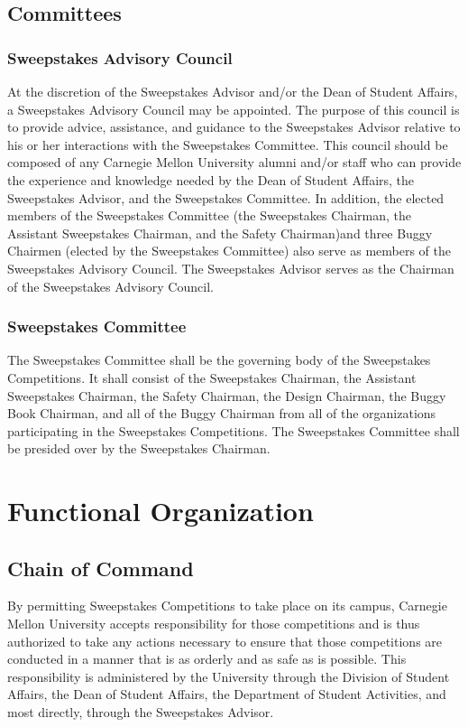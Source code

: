 \subsection{Committees}

\subsubsection{Sweepstakes Advisory Council}

	At the discretion of the Sweepstakes Advisor and/or the Dean of Student
	Affairs, a Sweepstakes Advisory Council may be appointed. The purpose of this
	council is to provide advice, assistance, and guidance to the Sweepstakes
	Advisor relative to his or her interactions with the Sweepstakes Committee.
	This council should be composed of any Carnegie Mellon University alumni and/or
	staff who can provide the experience and knowledge needed by the Dean of
	Student Affairs, the Sweepstakes Advisor, and the Sweepstakes Committee. In
	addition, the elected members of the Sweepstakes Committee (the Sweepstakes
	Chairman, the Assistant Sweepstakes Chairman, and the Safety Chairman)and three
	Buggy Chairmen (elected by the Sweepstakes Committee) also serve as members of
	the Sweepstakes Advisory Council. The Sweepstakes Advisor serves as the
	Chairman of the Sweepstakes Advisory Council.

\subsubsection{Sweepstakes Committee}

	The Sweepstakes Committee shall be the governing body of the Sweepstakes
	Competitions. It shall consist of the Sweepstakes Chairman, the Assistant
	Sweepstakes Chairman, the Safety Chairman, the Design Chairman, the Buggy Book
	Chairman, and all of the Buggy Chairman from all of the organizations
	participating in the Sweepstakes Competitions. The Sweepstakes Committee shall
	be presided over by the Sweepstakes Chairman.

\section{Functional Organization}

\subsection{Chain of Command}

	By permitting Sweepstakes Competitions to take place on its campus, Carnegie
	Mellon University accepts responsibility for those competitions and is thus
	authorized to take any actions necessary to ensure that those competitions are
	conducted in a manner that is as orderly and as safe as is possible. This
	responsibility is administered by the University through the Division of
	Student Affairs, the Dean of Student Affairs, the Department of Student
	Activities, and most directly, through the Sweepstakes Advisor.

